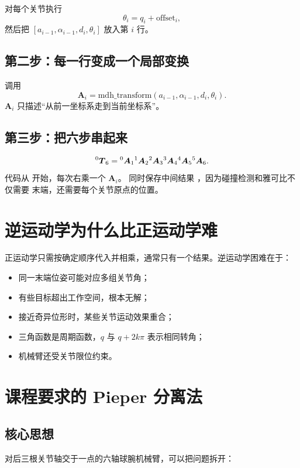  对每个关节执行
\[
\theta_i=q_i+\mathrm{offset}_i,
\]
然后把 $[a_{i-1},\alpha_{i-1},d_i,\theta_i]$ 放入第 $i$ 行。

\subsection{第二步：每一行变成一个局部变换}

调用
\[
\boldsymbol{A}_i=
\mathrm{mdh\_transform}(a_{i-1},\alpha_{i-1},d_i,\theta_i).
\]
$\boldsymbol{A}_i$ 只描述“从前一坐标系走到当前坐标系”。

\subsection{第三步：把六步串起来}

\[
{}^0\boldsymbol{T}_6=
{}^0\boldsymbol{A}_1
{}^1\boldsymbol{A}_2
{}^2\boldsymbol{A}_3
{}^3\boldsymbol{A}_4
{}^4\boldsymbol{A}_5
{}^5\boldsymbol{A}_6.
\]
代码从  开始，每次右乘一个 $\boldsymbol{A}_i$。
同时保存中间结果 ，因为碰撞检测和雅可比不仅需要
末端，还需要每个关节原点的位置。

\section{逆运动学为什么比正运动学难}

正运动学只需按确定顺序代入并相乘，通常只有一个结果。逆运动学困难在于：

\begin{itemize}
  \item 同一末端位姿可能对应多组关节角；
  \item 有些目标超出工作空间，根本无解；
  \item 接近奇异位形时，某些关节运动效果重合；
  \item 三角函数是周期函数，$q$ 与 $q+2k\pi$ 表示相同转角；
  \item 机械臂还受关节限位约束。
\end{itemize}

\section{课程要求的 Pieper 分离法}

\subsection{核心思想}

对后三根关节轴交于一点的六轴球腕机械臂，可以把问题拆开：

